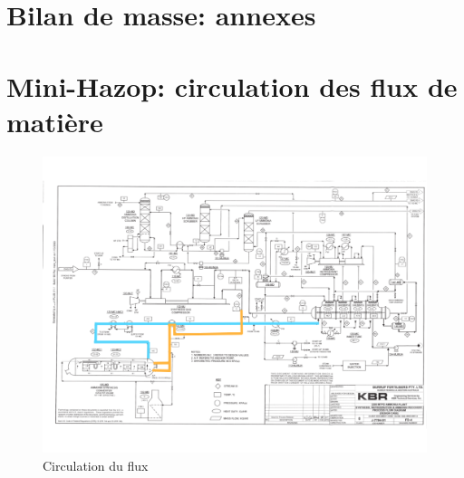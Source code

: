 \chapter{Bilan de masse: annexes}









\chapter{Mini-Hazop: circulation des flux de matière}

\label{Annexe Flux}

\begin{figure}[h]
	\begin{center}
	\includegraphics[scale=0.5]{task4/Plan1.png}
	\end{center}
	\caption{Circulation du flux}
	\label{cir1}
\end{figure}

